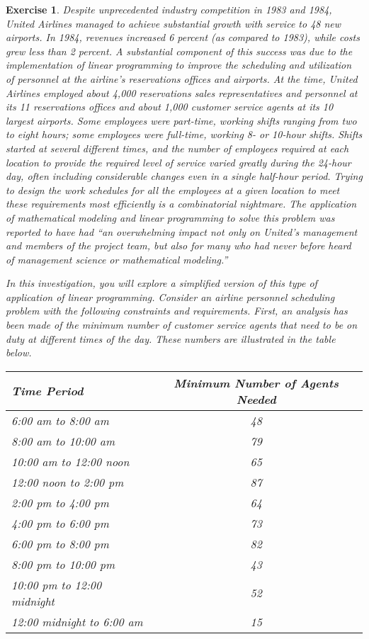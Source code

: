 \documentclass[letterpaper,10pt]{article}
\newtheorem{ex}{Exercise}
\begin{document}
\begin{ex}
Despite unprecedented industry competition in 1983 and 1984, United Airlines managed to achieve substantial growth with service to 48 new airports.  In 1984, revenues increased 6 percent (as compared to 1983), while costs grew less than 2 percent.  A substantial component of this success was due to the implementation of linear programming to improve the scheduling and utilization of personnel at the airline's reservations offices and airports.  At the time, United Airlines employed about 4,000 reservations sales representatives and personnel at its 11 reservations offices and about 1,000 customer service agents at its 10 largest airports.  Some employees were part-time, working shifts ranging from two to eight hours; some employees were full-time, working 8- or 10-hour shifts.  Shifts started at several different times, and the number of employees required at each location to provide the required level of service varied greatly during the 24-hour day, often including considerable changes even in a single half-hour period.  Trying to design the work schedules for all the employees at a given location to meet these requirements most efficiently is a combinatorial nightmare.  The application of mathematical modeling and linear programming to solve this problem was reported to have had ``an overwhelming impact not only on United's management and members of the project team, but also for many who had never before heard of management science or mathematical modeling.''

In this investigation, you will explore a simplified version of this type of application of linear programming.  Consider an airline personnel scheduling problem with the following constraints and requirements.  First, an analysis has been made of the {\em minimum} number of customer service agents that need to be on duty at different times of the day.  These numbers are illustrated in the table below.

\bigskip

\begin{center}

\begin{tabular}{|l|c|}\hline
{\bf Time Period}&{\bf Minimum Number of Agents Needed}\\\hline\hline
6:00 am to 8:00 am & 48\\\hline
8:00 am to 10:00 am & 79\\\hline
10:00 am to 12:00 noon & 65\\\hline
12:00 noon to 2:00 pm & 87\\\hline
2:00 pm to 4:00 pm & 64\\\hline
4:00 pm to 6:00 pm & 73\\\hline
6:00 pm to 8:00 pm & 82\\\hline
8:00 pm to 10:00 pm & 43\\\hline
10:00 pm to 12:00 midnight & 52\\\hline
12:00 midnight to 6:00 am & 15\\\hline
\end{tabular}


\end{center}
\end{ex}
\end{document}
